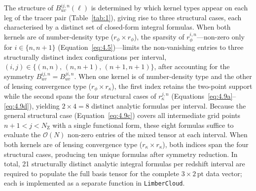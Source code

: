 The structure of \(B_{uv}^{ij,n}(\ell)\) is determined by which kernel types appear on each leg of the tracer pair (Table~\ref{tab:1}), giving rise to three structural cases, each characterised by a distinct set of closed-form integral formulas. When both kernels are of number-density type (\(r_\phi \times r_\phi\)), the sparsity of \(r_\phi^{i,n}\)---non-zero only for \(i \in \{n, n{+}1\}\) (Equation~\ref{eq:4.5})---limits the non-vanishing entries to three structurally distinct index configurations per interval, \((i,j) \in \{(n,n),\, (n,n{+}1),\, (n{+}1,n{+}1)\}\), after accounting for the symmetry \(B_{uv}^{ij,n} = B_{uv}^{ji,n}\). When one kernel is of number-density type and the other of lensing convergence type (\(r_\phi \times r_\kappa\)), the first index retains the two-point support while the second spans the four structural cases of \(r_\kappa^{j,n}\) (Equations~\ref{eq:4.9a}--\ref{eq:4.9d}), yielding \(2 \times 4 = 8\) distinct analytic formulas per interval. Because the general structural case (Equation~\ref{eq:4.9c}) covers all intermediate grid points \(n{+}1 < j < N_\mathrm{Z}\) with a single functional form, these eight formulas suffice to evaluate the \(\mathcal{O}(N)\) non-zero entries of the mixed tensor at each interval. When both kernels are of lensing convergence type (\(r_\kappa \times r_\kappa\)), both indices span the four structural cases, producing ten unique formulas after symmetry reduction. In total, 21 structurally distinct analytic integral formulas per redshift interval are required to populate the full basis tensor for the complete \(3\times2\,\mathrm{pt}\) data vector; each is implemented as a separate function in \texttt{LimberCloud}.

